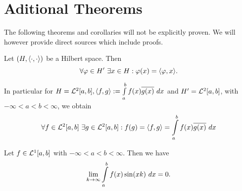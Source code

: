 \appendix
\chapter{Aditional Theorems}

The following theorems and corollaries will not be explicitly proven. We will however provide direct sources which include proofs.

\begin{theorem}\label{Rie-Fis}
	Let $(H, \inner{\cdot}{\cdot})$ be a Hilbert space. Then
	\[ \forall \varphi \in H'~\exists x \in H: \varphi(x) = \inner{\varphi}{x}. \]
\end{theorem}

\begin{corollary}
	In particular for $H = \ELL{2}[a, b], \inner{f}{g} := \int\limits_a^b f(x) \conj{g(x)}~dx$ and $H' = \ELL{2}[a,b]$, with $-\infty < a < b < \infty$, we obtain
	\[ \forall f \in \ELL{2}[a,b]~\exists g \in \ELL{2}[a,b]: f(g) = \inner{f}{g} = \int\limits_a^b f(x) \conj{g(x)}~dx \]
\end{corollary}

\begin{theorem}\label{Rie-Leb}
	Let $f \in \ELL{1}[a,b]$ with $-\infty < a < b < \infty$. Then we have
	\[ \lim\limits_{\Ninf[k]} \int\limits_a^b f(x)\sin(xk)~dx = 0. \]
\end{theorem}